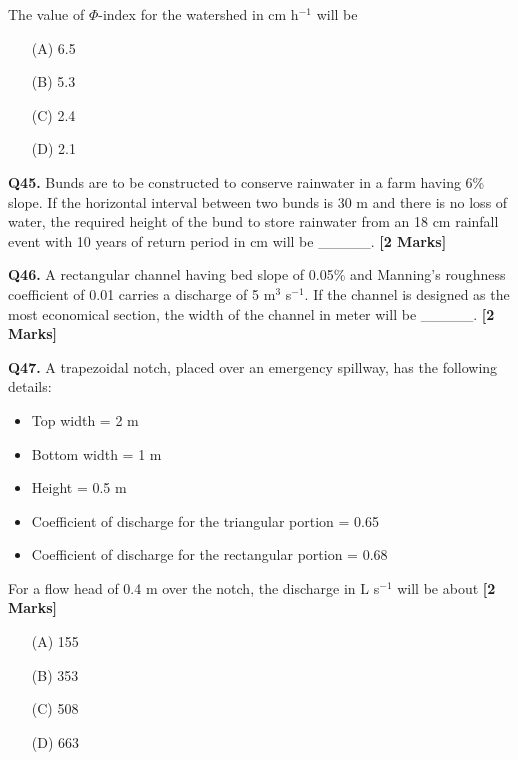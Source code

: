 \documentclass[11pt]{article}
\newcommand{\questionb}[2]{
    \noindent\textbf{Q#2.} #1 \hfill \textbf{[2 Marks]}
}
\begin{document}
The value of $\Phi$-index for the watershed in cm h$^{-1}$ will be
\begin{enumerate}
    \item[(A)] 6.5
    \item[(B)] 5.3
    \item[(C)] 2.4
    \item[(D)] 2.1
\end{enumerate}

\vspace{0.5cm}

\questionb{Bunds are to be constructed to conserve rainwater in a farm having 6\% slope. If the horizontal interval between two bunds is 30 m and there is no loss of water, the required height of the bund to store rainwater from an 18 cm rainfall event with 10 years of return period in cm will be \_\_\_\_\_.}{45}

\vspace{0.5cm}

\questionb{A rectangular channel having bed slope of 0.05\% and Manning's roughness coefficient of 0.01 carries a discharge of 5 m$^3$ s$^{-1}$. If the channel is designed as the most economical section, the width of the channel in meter will be \_\_\_\_\_.}{46}

\vspace{0.5cm}

\questionb{A trapezoidal notch, placed over an emergency spillway, has the following details:

\begin{itemize}
\item Top width = 2 m
\item Bottom width = 1 m
\item Height = 0.5 m
\item Coefficient of discharge for the triangular portion = 0.65
\item Coefficient of discharge for the rectangular portion = 0.68
\end{itemize}

For a flow head of 0.4 m over the notch, the discharge in L s$^{-1}$ will be about}{47}
\begin{enumerate}
    \item[(A)] 155
    \item[(B)] 353
    \item[(C)] 508
    \item[(D)] 663
\end{enumerate}

\vspace{0.5cm}
\end{document}
